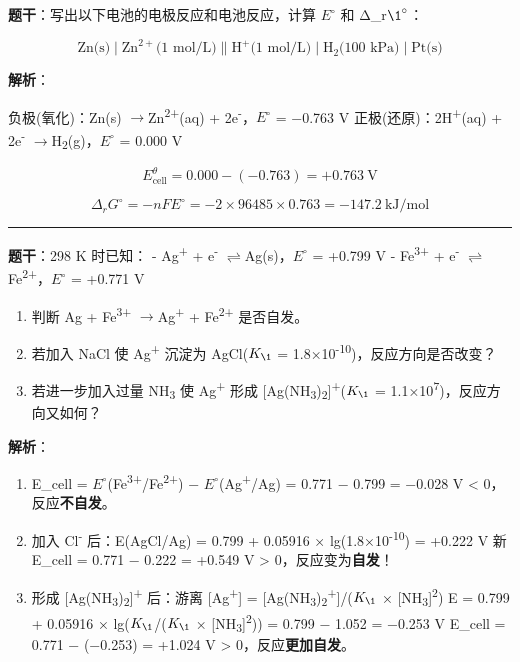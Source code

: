 \documentclass[a4paper,11pt]{ctexart}
\providecommand{\tightlist}{\setlength{\itemsep}{0pt}\setlength{\parskip}{0pt}}
\newcommand{\箭}{\ensuremath{\rightarrow}}
\newcommand{\左箭}{\ensuremath{\leftarrow}}
\newcommand{\上箭}{\ensuremath{\uparrow}}
\newcommand{\下箭}{\ensuremath{\downarrow}}
\newcommand{\衡}{\ensuremath{\rightleftharpoons}}
\newcommand{\双箭}{\ensuremath{\leftrightarrow}}
\newcommand{\约等于}{\ensuremath{\approx}}
\newcommand{\小于等于}{\ensuremath{\leq}}
\newcommand{\大于等于}{\ensuremath{\geq}}
\newcommand{\不等于}{\ensuremath{\neq}}
\newcommand{\西格马}{\ensuremath{\sigma}}
\newcommand{\派}{\ensuremath{\pi}}
\begin{document}
\textbf{题干}：写出以下电池的电极反应和电池反应，计算 \(E^{\circ}\) 和 Δ\_r\(\1^{\circ}\)：

\[
\text{Zn(s)} \mid \text{Zn}^{2+}\text{(1 mol/L)} \| \text{H}^+\text{(1 mol/L)} \mid \text{H}_2\text{(100 kPa)} \mid \text{Pt(s)}
\]

\textbf{解析}：

负极(氧化)：Zn(s) \箭 Zn\textsuperscript{2+}(aq) + 2e\textsuperscript{-}，\(E^{\circ}\) = −0.763 V
正极(还原)：2H\textsuperscript{+}(aq) + 2e\textsuperscript{-} \箭 H\textsubscript{2}(g)，\(E^{\circ}\) = 0.000 V

\[E_{\text{cell}}^\theta = 0.000 - (-0.763) = +0.763\ \mathrm{V}\]

\[\Delta_rG^\circ = -nFE^\circ = -2 \times 96485 \times 0.763 = -147.2\ \mathrm{kJ/mol}\]

\begin{center}\rule{0.5\linewidth}{0.5pt}\end{center}

\textbf{题干}：298 K 时已知：
- Ag\textsuperscript{+} + e\textsuperscript{-} \衡 Ag(s)，\(E^{\circ}\) = +0.799 V
- Fe\textsuperscript{3+} + e\textsuperscript{-} \衡 Fe\textsuperscript{2+}，\(E^{\circ}\) = +0.771 V

\begin{enumerate}
\def\labelenumi{(\alph{enumi})}
\tightlist
\item
  判断 Ag + Fe\textsuperscript{3+} \箭 Ag\textsuperscript{+} + Fe\textsuperscript{2+} 是否自发。
\item
  若加入 NaCl 使 Ag\textsuperscript{+} 沉淀为 AgCl(\(K_{\1}\) = 1.8×10\textsuperscript{-10})，反应方向是否改变？
\item
  若进一步加入过量 NH\textsubscript{3} 使 Ag\textsuperscript{+} 形成 {[}Ag(NH\textsubscript{3})\textsubscript{2}{]}\textsuperscript{+}(\(K_{\1}\) = 1.1×10\textsuperscript{7})，反应方向又如何？
\end{enumerate}

\textbf{解析}：

\begin{enumerate}
\def\labelenumi{(\alph{enumi})}
\item
  E\_cell = \(E^{\circ}\)(Fe\textsuperscript{3+}/Fe\textsuperscript{2+}) − \(E^{\circ}\)(Ag\textsuperscript{+}/Ag) = 0.771 − 0.799 = −0.028 V \textless{} 0，反应\textbf{不自发}。
\item
  加入 Cl\textsuperscript{-} 后：E(AgCl/Ag) = 0.799 + 0.05916 × lg(1.8×10\textsuperscript{-10}) = +0.222 V
  新 E\_cell = 0.771 − 0.222 = +0.549 V \textgreater{} 0，反应变为\textbf{自发}！
\item
  形成 {[}Ag(NH\textsubscript{3})\textsubscript{2}{]}\textsuperscript{+} 后：游离 {[}Ag\textsuperscript{+}{]} = {[}Ag(NH\textsubscript{3})\textsubscript{2}\textsuperscript{+}{]}/(\(K_{\1}\) × {[}NH\textsubscript{3}{]}\textsuperscript{2})
  E = 0.799 + 0.05916 × lg(\(K_{\1}\)/(\(K_{\1}\) × {[}NH\textsubscript{3}{]}\textsuperscript{2})) = 0.799 − 1.052 = −0.253 V
  E\_cell = 0.771 − (−0.253) = +1.024 V \textgreater{} 0，反应\textbf{更加自发}。
\end{enumerate}
\end{document}
